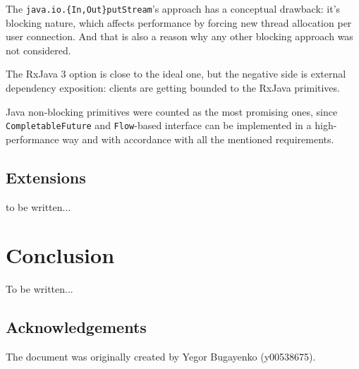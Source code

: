\documentclass[12pt,oneside]{article}
\newcommand\dd[1]{\colorbox{gray!30}{\texttt{#1}}}
\begin{document}
The \dd{java.io.\{In,Out\}putStream}'s approach has a conceptual drawback: it's blocking nature,
which affects performance by forcing new thread allocation per user connection. And that is
also a reason why any other blocking approach was not considered.

The RxJava 3 option is close to the ideal one, but the negative side is external
dependency exposition: clients are getting bounded to the RxJava primitives. 

Java non-blocking primitives were counted as the most promising
ones, since \dd{CompletableFuture} and \dd{Flow}-based interface can be implemented in a 
high-performance way and with accordance with all the mentioned requirements.

\subsection{Extensions}
to be written...

\section{Conclusion}
\label{sec:conclusion}

To be written...

\subsection{Acknowledgements}
\label{sec:ack}

The document was originally created by Yegor Bugayenko (y00538675).

\printbibliography%
\end{document}
